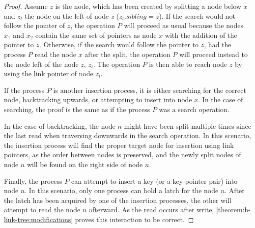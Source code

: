 \begin{proof}
  Assume $z$ is the node, which has been created by splitting a node below $x$ and $z_l$ the node on the left of node $z$ ($z_l.sibling = z$).
  If the search would not follow the pointer of $z$, the operation $P$ will proceed as usual because the nodes $x_1$ and $x_2$ contain the same set of pointers as node $x$ with the addition of the pointer to $z$. Otherwise, if the search would follow the pointer to $z$, had the process $P$ read the node $x$ after the split, the operation $P$ will proceed instead to the node left of the node $z$, $z_l$. The operation $P$ is then able to reach node $z$ by using the link pointer of node $z_l$.

  If the process $P$ is another insertion process, it is either searching for the correct node, backtracking upwards, or attempting to insert into node $x$. In the case of searching, the proof is the same as if the process $P$ was a search operation.

  In the case of backtracking, the node $n$ might have been split multiple times since the last read when traversing downwards in the search operation. In this scenario, the insertion process will find the proper target node for insertion using link pointers, as the order between nodes is preserved, and the newly split nodes of node $n$ will be found on the right side of node $n$.

  Finally, the process $P$ can attempt to insert a key (or a key-pointer pair) into node $n$. In this scenario, only one process can hold a latch for the node $n$. After the latch has been acquired by one of the insertion processes, the other will attempt to read the node $n$ afterward. As the read occurs after write, \cref{theorem:b-link-tree:modifications} proves this interaction to be correct.

\end{proof}

